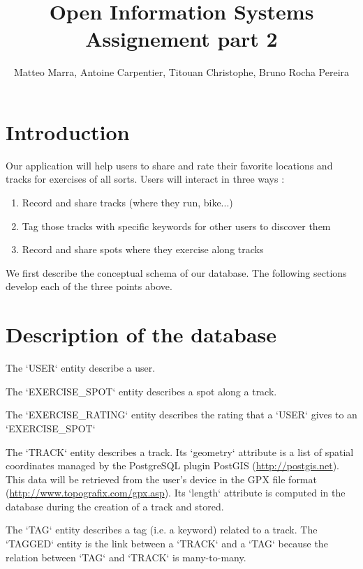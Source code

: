 \documentclass[a4paper]{article}
\title{Open Information Systems\\Assignement part 2 }
\author{Matteo Marra, Antoine Carpentier, Titouan Christophe, Bruno Rocha Pereira}
\begin{document}
\maketitle

\section{Introduction}

Our application will help users to share and rate their favorite locations and tracks for exercises of all sorts. Users will interact in three ways : 

\begin{enumerate}
    \item Record and share tracks (where they run, bike...)
    \item Tag those tracks with specific keywords for other users to discover them
    \item Record and share spots where they exercise along tracks
\end{enumerate}

We first describe the conceptual schema of our database. The following sections develop each of the three points above.

\section{Description of the database}

The `USER` entity describe a user.

The `EXERCISE\_SPOT` entity describes a spot along a track.

The `EXERCISE\_RATING` entity describes the rating that a `USER` gives to an `EXERCISE\_SPOT`

The `TRACK` entity describes a track. Its `geometry` attribute is a list of spatial coordinates managed by the PostgreSQL plugin PostGIS (\url{http://postgis.net}). This data will be retrieved from the user's device in the GPX file format (\url{http://www.topografix.com/gpx.asp}). Its `length` attribute is computed in the database during the creation of a track and stored.

The `TAG` entity describes a tag (i.e. a keyword) related to a track. The `TAGGED` entity is the link between a `TRACK` and a `TAG` because the relation between `TAG` and `TRACK` is many-to-many.
\end{document}
